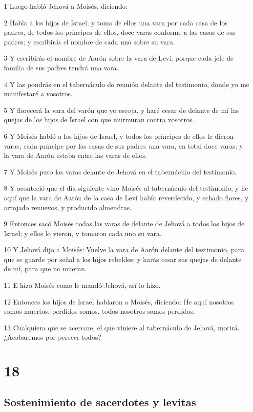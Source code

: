 \par 1 Luego habló Jehová a Moisés, diciendo:
\par 2 Habla a los hijos de Israel, y toma de ellos una vara por cada casa de los padres, de todos los príncipes de ellos, doce varas conforme a las casas de sus padres; y escribirás el nombre de cada uno sobre su vara.
\par 3 Y escribirás el nombre de Aarón sobre la vara de Leví; porque cada jefe de familia de sus padres tendrá una vara.
\par 4 Y las pondrás en el tabernáculo de reunión delante del testimonio, donde yo me manifestaré a vosotros.
\par 5 Y florecerá la vara del varón que yo escoja, y haré cesar de delante de mí las quejas de los hijos de Israel con que murmuran contra vosotros.
\par 6 Y Moisés habló a los hijos de Israel, y todos los príncipes de ellos le dieron varas; cada príncipe por las casas de sus padres una vara, en total doce varas; y la vara de Aarón estaba entre las varas de ellos.
\par 7 Y Moisés puso las varas delante de Jehová en el tabernáculo del testimonio.
\par 8 Y aconteció que el día siguiente vino Moisés al tabernáculo del testimonio; y he aquí que la vara de Aarón de la casa de Leví había reverdecido, y echado flores, y arrojado renuevos, y producido almendras. 
\par 9 Entonces sacó Moisés todas las varas de delante de Jehová a todos los hijos de Israel; y ellos lo vieron, y tomaron cada uno su vara.
\par 10 Y Jehová dijo a Moisés: Vuelve la vara de Aarón delante del testimonio, para que se guarde por señal a los hijos rebeldes; y harás cesar sus quejas de delante de mí, para que no mueran.
\par 11 E hizo Moisés como le mandó Jehová, así lo hizo.
\par 12 Entonces los hijos de Israel hablaron a Moisés, diciendo: He aquí nosotros somos muertos, perdidos somos, todos nosotros somos perdidos.
\par 13 Cualquiera que se acercare, el que viniere al tabernáculo de Jehová, morirá. ¿Acabaremos por perecer todos?

\chapter{18}

\section*{Sostenimiento de sacerdotes y levitas}


